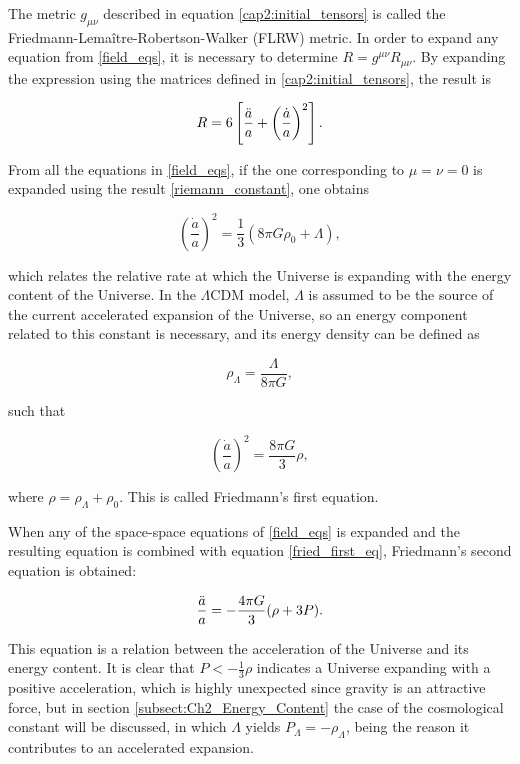 \documentclass[openany,a4paper,12pt,oneside]{book}
\begin{document}
\begin{spacing}{1.5}
The metric $g_{\mu\nu}$ described in equation \eqref{cap2:initial_tensors} is called the Friedmann-Lemaître-Robertson-Walker (FLRW) metric\cite{FLRW_metric}. In order to expand any equation from \eqref{field_eqs}, it is necessary to determine $R=g^{\mu\nu}R_{\mu\nu}$. By expanding the expression using the matrices defined in \eqref{cap2:initial_tensors}, the result is

\begin{equation}\label{riemann_constant}
    R=6\left[\frac{\Ddot{a}}{a}+\left(\frac{\dot{a}}{a}\right)^2\right].
\end{equation}

From all the equations in \eqref{field_eqs}, if the one corresponding to $\mu=\nu=0$ is expanded using the result \eqref{riemann_constant}, one obtains

\begin{equation}\label{fried1_step1}
    \left(\frac{\dot{a}}{a}\right)^2=\frac{1}{3}\left(8\pi G\rho_0+\Lambda\right),
\end{equation}

\noindent which relates the relative rate at which the Universe is expanding with the energy content of the Universe. In the $\Lambda$CDM model, $\Lambda$ is assumed to be the source of the current accelerated expansion of the Universe, so an energy component related to this constant is necessary, and its energy density can be defined as

\begin{equation}\label{def:rho_lambda}
    \rho_\Lambda=\frac{\Lambda}{8\pi G},
\end{equation}

\noindent such that

\begin{equation}\label{fried_first_eq}
    \left(\frac{\dot{a}}{a}\right)^2=\frac{8\pi G}{3}\rho,
\end{equation}

\noindent where $\rho=\rho_\Lambda+\rho_0$. This is called Friedmann's first equation. 

When any of the space-space equations of \eqref{field_eqs} is expanded and the resulting equation is combined with equation \eqref{fried_first_eq}, Friedmann's second equation is obtained:

\begin{equation}\label{fried_second_eq}
    \frac{\Ddot{a}}{a}=-\frac{4\pi G}{3}(\rho+3P).
\end{equation}

This equation is a relation between the acceleration of the Universe and its energy content. It is clear that $P<-\frac{1}{3}\rho$ indicates a Universe expanding with a positive acceleration, which is highly unexpected since gravity is an attractive force, but in section \ref{subsect:Ch2_Energy_Content} the case of the cosmological constant will be discussed, in which $\Lambda$ yields $P_\Lambda=-\rho_\Lambda$, being the reason it contributes to an accelerated expansion.


\end{spacing}
\end{document}
